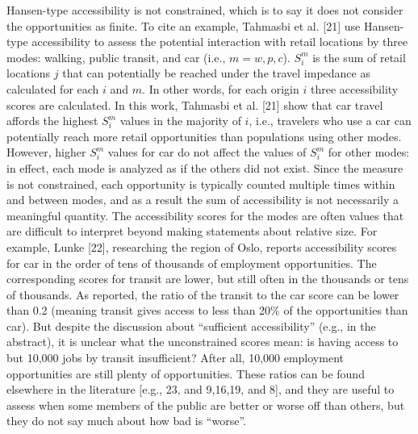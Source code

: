 \documentclass[10pt,letterpaper]{article}
\begin{document}
Hansen-type accessibility is not constrained, which is to say it does
not consider the opportunities as finite. To cite an example, Tahmasbi
et al. {[}21{]} use Hansen-type accessibility to assess the potential
interaction with retail locations by three modes: walking, public
transit, and car (i.e., \(m = w, p, c\)). \(S_i^m\) is the sum of retail
locations \(j\) that can potentially be reached under the travel
impedance as calculated for each \(i\) and \(m\). In other words, for
each origin \(i\) three accessibility scores are calculated. In this
work, Tahmasbi et al. {[}21{]} show that car travel affords the highest
\(S_i^{m}\) values in the majority of \(i\), i.e., travelers who use a
car can potentially reach more retail opportunities than populations
using other modes. However, higher \(S_i^{m}\) values for car do not
affect the values of \(S_i^{m}\) for other modes: in effect, each mode
is analyzed as if the others did not exist. Since the measure is not
constrained, each opportunity is typically counted multiple times within
and between modes, and as a result the sum of accessibility is not
necessarily a meaningful quantity. The accessibility scores for the
modes are often values that are difficult to interpret beyond making
statements about relative size. For example, Lunke {[}22{]}, researching
the region of Oslo, reports accessibility scores for car in the order of
tens of thousands of employment opportunities. The corresponding scores
for transit are lower, but still often in the thousands or tens of
thousands. As reported, the ratio of the transit to the car score can be
lower than 0.2 (meaning transit gives access to less than 20\% of the
opportunities than car). But despite the discussion about ``sufficient
accessibility'' (e.g., in the abstract), it is unclear what the
unconstrained scores mean: is having access to but 10,000 jobs by
transit insufficient? After all, 10,000 employment opportunities are
still plenty of opportunities. These ratios can be found elsewhere in
the literature {[}e.g., 23, and 9,16,19, and 8{]}, and they are useful
to assess when some members of the public are better or worse off than
others, but they do not say much about how bad is ``worse''.
\end{document}
